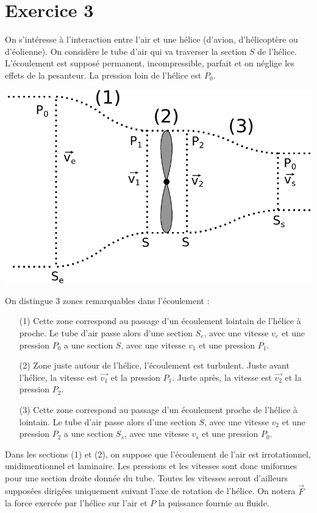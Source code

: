 \documentclass{report}
\begin{document}
\newpage

\section*{Exercice 3}

On s'intéresse à l'interaction entre l'air et une hélice (d'avion, d'hélicoptère ou d'éolienne). On considère le tube d'air qui va traverser la section $S$ de l'hélice. L'écoulement est supposé permanent, incompressible, parfait et on néglige les effets de la pesanteur. La pression loin de l'hélice est $P_0$. 

\begin{center}
	\includegraphics[scale=0.5]{meca_flu6.pdf}
\end{center}

On distingue 3 zones remarquables dans l'écoulement :
\begin{itemize}
	\item[(1) ] Cette zone correspond au passage d'un écoulement lointain de l'hélice à proche. Le tube d'air passe alors d'une section $S_e$, avec une vitesse $v_e$ et une pression $P_0$ a une section $S$, avec une vitesse $v_1$ et une pression $P_1$.
	\item[(2) ] Zone juste autour de l'hélice, l'écoulement est turbulent. Juste avant l'hélice, la vitesse est $\vec{v_1}$ et la pression $P_1$. Juste après, la vitesse est $\vec{v_2}$ et la pression $P_2$.
	\item[(3) ] Cette zone correspond au passage d'un écoulement proche de l'hélice à lointain. Le tube d'air passe alors d'une section $S$, avec une vitesse $v_2$ et une pression $P_2$ a une section $S_s$, avec une vitesse $v_s$ et une pression $P_0$.
\end{itemize}
Dans les sections (1) et (2), on suppose que l'écoulement de l'air est irrotationnel, unidimentionnel et laminaire. Les pressions et les vitesses sont donc uniformes pour une section droite donnée du tube. Toutes les vitesses seront d'ailleurs supposées dirigées uniquement suivant l'axe de rotation de l'hélice. 
On notera $\vec{F}$ la force exercée par l'hélice sur l'air et $P$ la puissance fournie au fluide.
\end{document}
